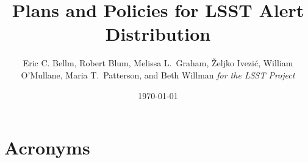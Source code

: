 \documentclass[DM,toc,lsstdraft]{lsstdoc}
\title{Plans and Policies for LSST Alert Distribution}
\author{
Eric C. Bellm, Robert Blum, Melissa L.~Graham, \v{Z}eljko Ivezi\'{c}, William O'Mullane, Maria T.~Patterson,  and Beth Willman
     \emph{for the LSST Project}
}
\date{\today}
\begin{document}
\maketitle









\clearpage

\section{Acronyms}



\end{document}

